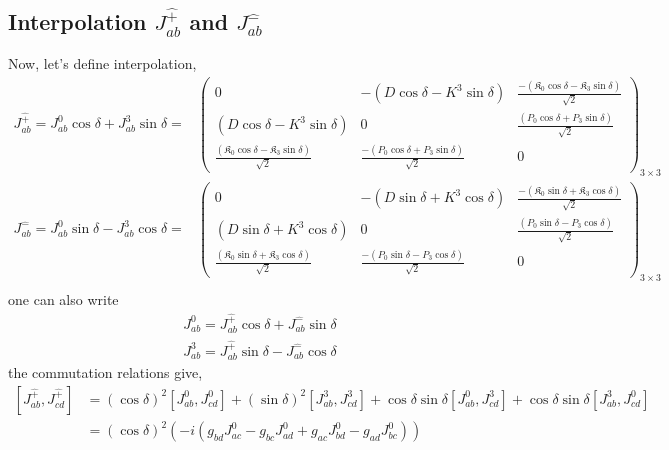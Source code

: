 \documentclass[]{article}
\numberwithin{equation}{section}
\begin{document}
{{\subsection{Interpolation $J^{\hat{+}}_{ab}$ and $J^{\hat{-}}_{ab}$}
  Now, let's define interpolation,
  \begin{align}
      J^{\hat{+}}_{ab}=J^0_{ab}\cos{\delta}+J^3_{ab}\sin{\delta}=&
  \begin{pmatrix}
  0&-(D\cos{\delta}-K^3\sin{\delta})&\frac{-(\mathfrak{K}_0\cos{\delta}-\mathfrak{K}_3\sin{\delta})}{\sqrt{2}}\\
  (D\cos{\delta}-K^3\sin{\delta})&0&\frac{(P_0\cos{\delta}+P_3\sin{\delta})}{\sqrt{2}}\\
    \frac{(\mathfrak{K}_0\cos{\delta}-\mathfrak{K}_3\sin{\delta})}{\sqrt{2}}&\frac{-(P_0\cos{\delta}+P_3\sin{\delta})}{\sqrt{2}}&0  
  \end{pmatrix}_{3\times3}\\
   J^{\hat{-}}_{ab}=J^0_{ab}\sin{\delta}-J^3_{ab}\cos{\delta}=&
  \begin{pmatrix}
  0&-(D\sin{\delta}+K^3\cos{\delta})&\frac{-(\mathfrak{K}_0\sin{\delta}+\mathfrak{K}_3\cos{\delta})}{\sqrt{2}}\\
  (D\sin{\delta}+K^3\cos{\delta})&0&\frac{(P_0\sin{\delta}-P_3\cos{\delta})}{\sqrt{2}}\\
    \frac{(\mathfrak{K}_0\sin{\delta}+\mathfrak{K}_3\cos{\delta})}{\sqrt{2}}&\frac{-(P_0\sin{\delta}-P_3\cos{\delta})}{\sqrt{2}}&0  
  \end{pmatrix}_{3\times3}\\
  \end{align}
one can also write
\begin{align}
     J^{0}_{ab}=J^{\hat{+}}_{ab}\cos{\delta}+J^{\hat{-}}_{ab}\sin{\delta}\\
     J^{3}_{ab}=J^{\hat{+}}_{ab}\sin{\delta}-J^{\hat{-}}_{ab}\cos{\delta}
\end{align}
the commutation relations give,
\begin{align}
    \left[J^{\hat{+}}_{ab},J^{\hat{+}}_{cd}\right]&=(\cos{\delta})^2\left[J^{0}_{{a}{b}},J^{0}_{{c}{d}}\right]+(\sin{\delta})^2\left[J^{3}_{{a}{b}},J^{3}_{{c}{d}}\right]+\cos{\delta}\sin{\delta}\left[J^{0}_{{a}{b}},J^{3}_{{c}{d}}\right]+\cos{\delta}\sin{\delta}\left[J^{3}_{{a}{b}},J^{0}_{{c}{d}}\right]\\
    &=(\cos{\delta})^2(-i\left(g_{{b}{d}}J^{0}_{{a}{c}}-g_{{b}{c}}J^{0}_{{a}{d}}+g_{{a}{c}}J^{0}_{{b}{d}}-g_{{a}{d}}J^{0}_{{b}{c}}\right))\nonumber\\

\end{align}}}
\end{document}
